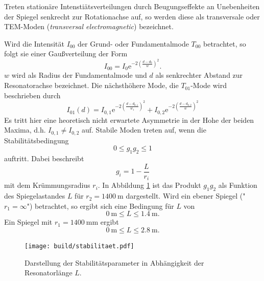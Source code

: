 Treten stationäre Intenstiätsverteilungen durch Beugungseffekte an Unebenheiten
der Spiegel senkrecht zur Rotationachse auf, so werden diese als transversale oder
TEM-Moden (\textit{transversal electromagnetic}) bezeichnet.

Wird die Intensität $I_{00}$ der Grund- oder Fundamentalmode $T_{00}$ betrachtet, so
folgt sie einer Gaußverteilung der Form
\begin{equation}
  I_{00} = I_0 \text{e}^{-2\left(\frac{d-d_0}{w}\right)^2}.
  \label{eqn:t00}
\end{equation}
$w$ wird als Radius der Fundamentalmode und $d$ als senkrechter Abstand zur Resonatorachse
bezeichnet. Die nächsthöhere Mode, die $T_{01}$-Mode wird beschrieben durch
\begin{equation}
  I_{01}(d) = I_{0,1}\text{e}^{-2\left(\frac{d-d_{0,1}}{w_1}\right)^2}+I_{0,2}\text{e}^{-2\left(\frac{d-d_{0,2}}{w}\right)^2}
\label{eqn:t10}
\end{equation}
Es tritt hier eine heoretisch nicht erwartete Asymmetrie in der Hohe der beiden Maxima,
d.h. $I_{0,1} \neq I_{0,2}$ auf.
Stabile Moden treten auf, wenn die Stabilitätsbedingung
\begin{equation}
  0\leq g_1g_2\leq 1
\end{equation}
auftritt. Dabei beschreibt
\begin{equation}
  g_i = 1 - \frac{L}{r_i}
\end{equation}
mit dem Krümmungsradius $r_i$. In Abbildung \ref{fig:stabilität} ist das Produkt $g_1g_2$
als Funktion des Spiegelastandes $L$  für $r_2 = \SI{1400}{\metre}$ dargestellt. Wird ein
ebener Spiegel ("$r_1 = \infty$") betrachtet, so ergibt sich eine Bedingung für
$L$ von
\begin{equation}
  \SI{0}{\metre} \leq L \leq \SI{1.4}{\metre}.
\end{equation}
Ein Spiegel mit $r_1 = \SI{1400}{\milli\metre}$ ergibt
\begin{equation}
    \SI{0}{\metre} \leq L \leq \SI{2.8}{\metre}.
\end{equation}

\begin{figure}
  \centering
  \texttt{[image: build/stabilitaet.pdf]}
  \caption{Darstellung der Stabilitätsparameter in Abhängigkeit der
  Resonatorlänge $L$.}
  \label{fig:stabilität}
\end{figure}

